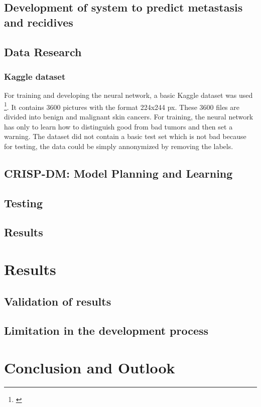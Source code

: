 \section{Development of system to predict metastasis and recidives} 

\section{Data Research}
\subsection{Kaggle dataset}
For training and developing the neural network, a basic Kaggle dataset was used \footnote{\cite{kaggle_dataset}}. It contains 3600 pictures with the format 224x244 px. These 3600 files are divided into benign and malignant skin cancers. 
For training, the neural network has only to learn how to distinguish good from bad tumors and then set a warning. 
The dataset did not contain a basic test set which is not bad because for testing, the data could be simply annonymized by removing the labels.

\section{\ac{CRISP-DM}: Model Planning and Learning}
\section{Testing}
\section{Results} 

\chapter{Results}
\section{Validation of results}
\section{Limitation in the development process}

\chapter{Conclusion and Outlook}
